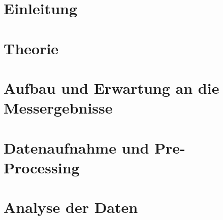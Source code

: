 \documentclass[11pt,a4paper,twoside,headsepline,numbers=noenddot,toc=bibliography,cleardoublepage=empty,parskip=half,DIV=calc,BCOR=6mm,pagesize=pdftex]{article}
\begin{document}
	
\pagestyle{empty}




\clearpage
\mbox{}
\clearpage
\clearpage
\mbox{}
\clearpage
\pagestyle{plain}


\tableofcontents
\restoregeometry
\clearpage
\mbox{}
\clearpage
{}
\setcounter{page}{1}
 

\section{Einleitung}
\label{sec:Einleitung}

\clearpage
\mbox{}
\clearpage

\section{Theorie}
\label{sec:Theorie}

\clearpage
\mbox{}
\clearpage

\section{Aufbau und Erwartung an die Messergebnisse}
\label{sec:Aufbau}

\clearpage
\mbox{}
\clearpage

\section{Datenaufnahme und Pre-Processing}
\label{sec:Datenaufnahme und Pre-Processing}

\clearpage
\mbox{}
\clearpage

\section{Analyse der Daten}
\label{sec:Analyse}

\clearpage
\mbox{}
\clearpage
\end{document}
